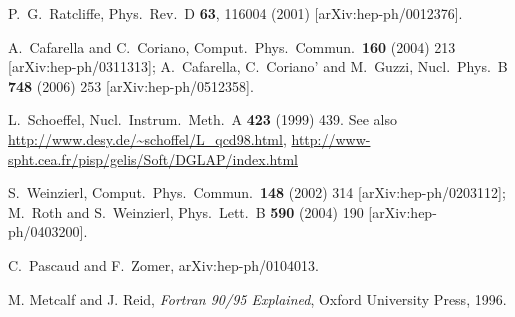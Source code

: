 \documentclass[12pt]{article}
\begin{document}
\begin{thebibliography}{99}

  P.~G.~Ratcliffe,
  Phys.\ Rev.\  D {\bf 63}, 116004 (2001)
  [arXiv:hep-ph/0012376].

 A.~Cafarella and C.~Coriano,
Comput.\ Phys.\ Commun.\  {\bf 160} (2004) 213
[arXiv:hep-ph/0311313];
  A.~Cafarella, C.~Coriano' and M.~Guzzi,
  Nucl.\ Phys.\  B {\bf 748} (2006) 253
  [arXiv:hep-ph/0512358].


L.~Schoeffel,
Nucl.\ Instrum.\ Meth.\ A {\bf 423} (1999) 439.
See also \url{http://www.desy.de/~schoffel/L_qcd98.html},
\url{http://www-spht.cea.fr/pisp/gelis/Soft/DGLAP/index.html}


S.~Weinzierl,
Comput.\ Phys.\ Commun.\  {\bf 148} (2002) 314
[arXiv:hep-ph/0203112];
M.~Roth and S.~Weinzierl,
Phys.\ Lett.\ B {\bf 590} (2004) 190
[arXiv:hep-ph/0403200].



C.~Pascaud and F.~Zomer,
arXiv:hep-ph/0104013.

  M. Metcalf and J. Reid, \emph{Fortran 90/95 Explained}, Oxford
  University Press, 1996.


\end{thebibliography}
\end{document}
